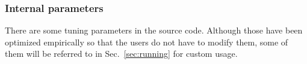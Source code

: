 \documentclass[preprint,12pt]{elsarticle}
\begin{document}
\subsubsection{Internal parameters}
There are some tuning parameters in the source code. Although those have been optimized empirically so that the users do not have to modify them, some of them will be referred to in Sec.~\ref{sec:running} for custom usage.

\end{document}
